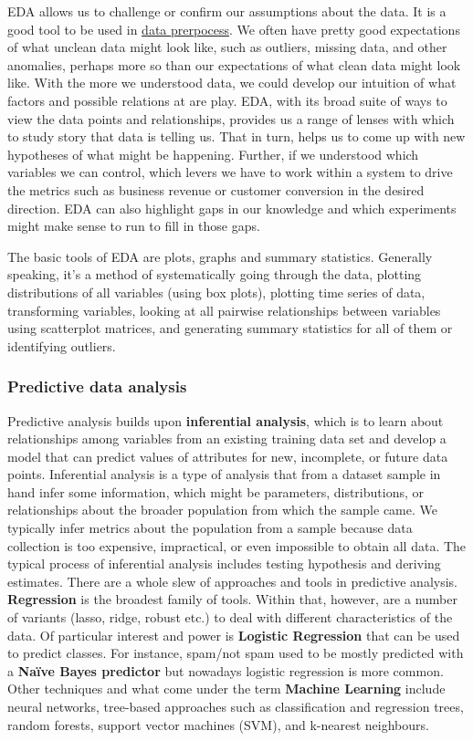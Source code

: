 \documentclass[
]{book}
\begin{document}
EDA allows us to challenge or confirm our assumptions about the data. It is a good tool to be used in \protect\hyperlink{preprocess}{data prerpocess}. We often have pretty good expectations of what unclean data might look like, such as outliers, missing data, and other anomalies, perhaps more so than our expectations of what clean data might look like. With the more we understood data, we could develop our intuition of what factors and possible relations at are play. EDA, with its broad suite of ways to view the data points and relationships, provides us a range of lenses with which to study story that data is telling us. That in turn, helps us to come up with new hypotheses of what might be happening. Further, if we understood which variables we can control, which levers we have to work within a system to drive the metrics such as business revenue or customer conversion in the desired direction. EDA can also highlight gaps in our knowledge and which experiments might make sense to run to fill in those gaps.

The basic tools of EDA are plots, graphs and summary statistics. Generally speaking, it's a method of systematically going through the data, plotting distributions of all variables (using box plots), plotting time series of data, transforming variables, looking at all pairwise relationships between variables using scatterplot matrices, and generating summary statistics for all of them or identifying outliers.

\hypertarget{predictive}{%
\subsubsection*{\texorpdfstring{\textbf{Predictive data analysis }}{Predictive data analysis }}\label{predictive}}


Predictive analysis builds upon \textbf{inferential analysis}, which is to learn about relationships among variables from an existing training data set and develop a model that can predict values of attributes for new, incomplete, or future data points. Inferential analysis is a type of analysis that from a dataset sample in hand infer some information, which might be parameters, distributions, or relationships about the broader population from which the sample came. We typically infer metrics about the population from a sample because data collection is too expensive, impractical, or even impossible to obtain all data. The typical process of inferential analysis includes testing hypothesis and deriving estimates.
There are a whole slew of approaches and tools in predictive analysis. \textbf{Regression} is the broadest family of tools. Within that, however, are a number of variants (lasso, ridge, robust etc.) to deal with different characteristics of the data. Of particular interest and power is \textbf{Logistic Regression} that can be used to predict classes. For instance, spam/not spam used to be mostly predicted with a \textbf{Naïve Bayes predictor} but nowadays logistic regression is more common. Other techniques and what come under the term \textbf{Machine Learning} include neural networks, tree-based approaches such as classification and regression trees, random forests, support vector machines (SVM), and k-nearest neighbours.
\end{document}
